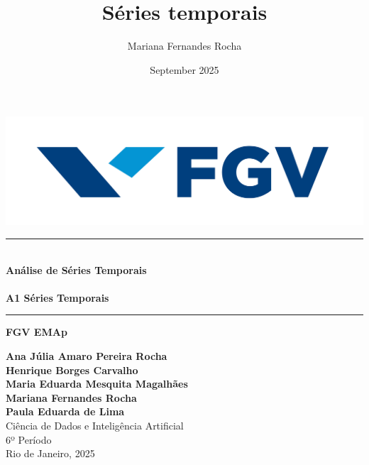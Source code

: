 \documentclass{article}
\title{Séries temporais}
\author{Mariana Fernandes Rocha}
\date{September 2025}
\begin{document}
\begin{titlepage}
    \begin{center}

        \vspace{1cm}
        \begin{minipage}{0.45\textwidth}
            \centering
            \includegraphics[width=1.2\textwidth]{images/logo_fgv.png}    
        \end{minipage}
        \vspace{2cm}

        \rule{1\textwidth}{0.4pt} \\ %
        \vspace{0.3cm}
        {\Huge \textbf{Análise de Séries Temporais}} \\
        \vspace{0.2cm}
        \vspace{0.5cm}\\
        {\Large \textbf{A1 Séries Temporais}}\\
        \rule{1\textwidth}{0.4pt} %


        \vspace{0.5cm}
        {\Large \textbf{FGV EMAp}} \\
        \vspace{2cm}
        
        

        
        
        
        {\large 
            \textbf{Ana Júlia Amaro Pereira Rocha} \\ 
            \textbf{Henrique Borges Carvalho} \\
            \textbf{Maria Eduarda Mesquita Magalhães}\\
            \textbf{Mariana Fernandes Rocha} \\
            \textbf{Paula Eduarda de Lima}}\\[1.5cm]
        
        {\large 
            Ciência de Dados e Inteligência Artificial \\ 
            6º Período}\\[2cm]
        
        \vfill
        {\large Rio de Janeiro, 2025}

        
    \end{center}
\end{titlepage}
\end{document}
